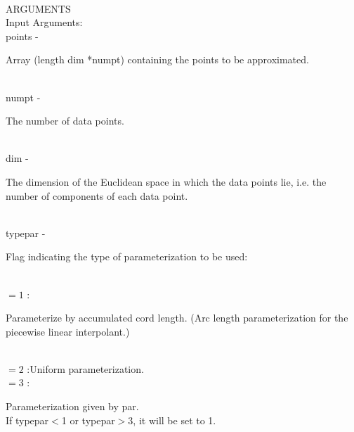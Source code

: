 \\
ARGUMENTS\\
        \>Input Arguments:\\
        \>\>    {\fov points}   \> - \> \begin{minipg2}
                                Array (length dim *numpt) containing the points to be
                                approximated.
                                \end{minipg2}\\[0.3ex]
        \>\>    {\fov numpt}    \> - \> \begin{minipg2}
                                The number of data points.
                                \end{minipg2}\\
        \>\>    {\fov dim}      \> - \> \begin{minipg2}
                                The dimension of the Euclidean space in which the
                                data points lie, i.e. the number of components of
                                each data point.
                                \end{minipg2}\\
        \>\>    {\fov typepar}  \> - \> \begin{minipg2}
                                Flag indicating the type of parameterization to be
                                        used:
                                \end{minipg2}\\[0.8ex]
                \>\>\>\>\>      $=1$ :\>\begin{minipg5}
                                        Parameterize by accumulated cord length.
                                        (Arc length parameterization for the
                                        piecewise linear interpolant.)
                                \end{minipg5}\\[0.3ex]
                \>\>\>\>\>      $=2$ :\>Uniform parameterization.\\
                \>\>\>\>\>      $=3$ :\>\begin{minipg5}
                                        Parameterization given by {\fov par}.\\
                                        If typepar$<$1 or typepar$>$3, it
                                        will be set to 1.
                                        \end{minipg5}\\[0.8ex]
